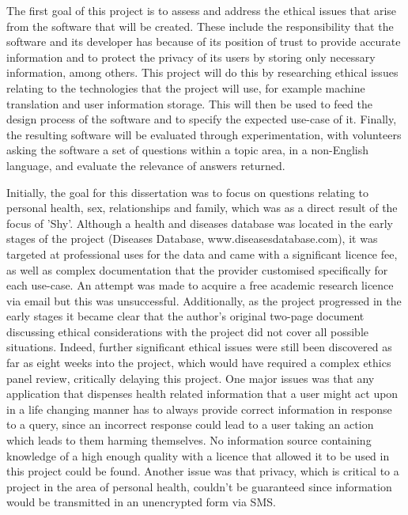 \documentclass[authoryearcitations]{UoYCSproject}
\begin{document}
The first goal of this project is to assess and address the ethical issues that arise from the software that will be created.  These include the responsibility that the software and its developer has because of its position of trust to provide accurate information and to protect the privacy of its users by storing only necessary information, among others.  This project will do this by researching ethical issues relating to the technologies that the project will use, for example machine translation and user information storage.  This will then be used to feed the design process of the software and to specify the expected use-case of it.  Finally, the resulting software will be evaluated through experimentation, with volunteers asking the software a set of questions within a topic area, in a non-English language, and evaluate the relevance of answers returned.

Initially, the goal for this dissertation was to focus on questions relating to personal health, sex, relationships and family, which was as a direct result of the focus of 'Shy'.  Although a health and diseases database was located in the early stages of the project (Diseases Database, www.diseasesdatabase.com), it was targeted at professional uses for the data and came with a significant licence fee, as well as complex documentation that the provider customised specifically for each use-case.  An attempt was made to acquire a free academic research licence via email but this was unsuccessful.  Additionally, as the project progressed in the early stages it became clear that the author's original two-page document discussing ethical considerations with the project did not cover all possible situations.  Indeed, further significant ethical issues were still been discovered as far as eight weeks into the project, which would have required a complex ethics panel review, critically delaying this project.  One major issues was that any application that dispenses health related information that a user might act upon in a life changing manner has to always provide correct information in response to a query, since an incorrect response could lead to a user taking an action which leads to them harming themselves. No information source containing knowledge of a high enough quality with a licence that allowed it to be used in this project could be found. Another issue was that privacy, which is critical to a project in the area of personal health, couldn't be guaranteed since information would be transmitted in an unencrypted form via SMS.
\end{document}
